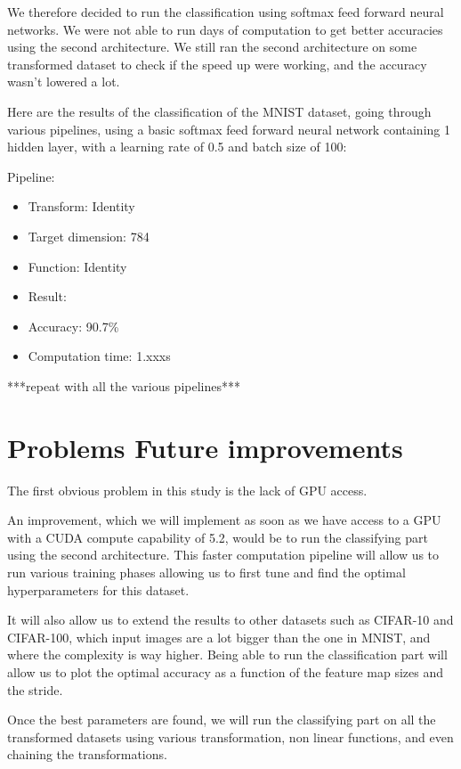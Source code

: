 \documentclass[11pt,a4paper]{article}
\begin{document}
	
	We therefore decided to run the classification using softmax feed forward neural networks. We were not able to run days of computation to get better accuracies using the second architecture. We still ran the second architecture on some transformed dataset to check if the speed up were working, and the accuracy wasn't lowered a lot. 
	
	
	Here are the results of the classification of the MNIST dataset, going through various pipelines, using a basic softmax feed forward neural network containing 1 hidden layer, with a learning rate of 0.5 and batch size of 100:
	
	Pipeline:
	\begin{itemize}
			\item Transform: Identity
			\item Target dimension: 784
			\item Function: Identity
			\item Result:
			\item Accuracy: 90.7\%
			\item Computation time: 1.xxxs
	\end{itemize}

	
	***repeat with all the various pipelines***
	
	
	\section{Problems Future improvements}
	The first obvious problem in this study is the lack of GPU access.
	
	
	An improvement, which we will implement as soon as we have access to a GPU with a CUDA compute capability of 5.2, would be to run the classifying part using the second architecture.
	This faster computation pipeline will allow us to run various training phases allowing us to first tune and find the optimal hyperparameters for this dataset.
	
	
	It will also allow us to extend the results to other datasets such as CIFAR-10 and CIFAR-100, which input images are a lot bigger than the one in MNIST, and where the complexity is way higher.
	Being able to run the classification part will allow us to plot the optimal accuracy as a function of the feature map sizes and the stride.
	
	
	Once the best parameters are found, we will run the classifying part on all the transformed datasets using various transformation, non linear functions, and even chaining the transformations.
	
\end{document}
